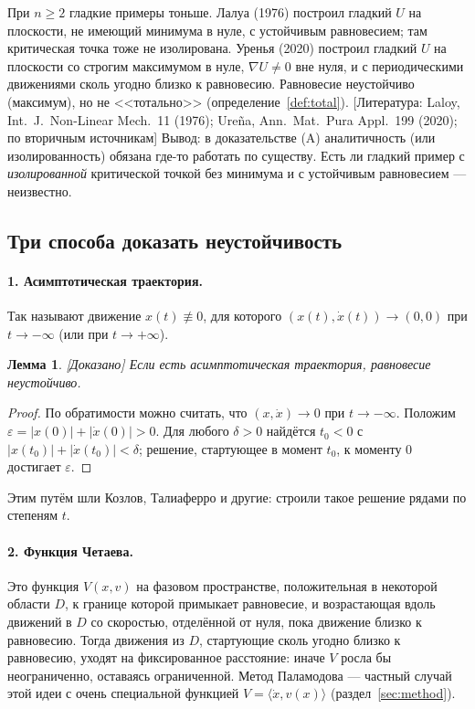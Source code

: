 \documentclass[11pt,a4paper]{article}
\newtheorem{lemma}[theorem]{Лемма}
\theoremstyle{definition}
\newcommand{\eps}{\varepsilon}
\newcommand{\mk}[1]{\textsf{[#1]}}
\begin{document}
При $n\ge2$ гладкие примеры тоньше. Лалуа (1976) построил гладкий $U$ на плоскости, не имеющий
минимума в нуле, с устойчивым равновесием; там критическая точка тоже не изолирована.
Уренья (2020) построил гладкий $U$ на плоскости со строгим максимумом в нуле, $\nabla U\ne0$ вне
нуля, и с периодическими движениями сколь угодно близко к равновесию. Равновесие неустойчиво
(максимум), но не <<тотально>> (определение~\ref{def:total}). \mk{Литература: Laloy, Int.\ J.\
Non-Linear Mech.\ 11 (1976); Ureña, Ann.\ Mat.\ Pura Appl.\ 199 (2020); по вторичным
источникам} Вывод: в доказательстве (A) аналитичность (или изолированность) обязана где-то
работать по существу. Есть ли гладкий пример с \emph{изолированной} критической точкой без
минимума и с устойчивым равновесием --- неизвестно.

\subsection{Три способа доказать неустойчивость}\label{subsec:three}

\paragraph{1. Асимптотическая траектория.} Так называют движение $x(t)\not\equiv0$, для
которого $(x(t),\dot x(t))\to(0,0)$ при $t\to-\infty$ (или при $t\to+\infty$).

\begin{lemma}\label{lem:asympt}
\mk{Доказано} Если есть асимптотическая траектория, равновесие неустойчиво.
\end{lemma}
\begin{proof}
По обратимости можно считать, что $(x,\dot x)\to0$ при $t\to-\infty$. Положим
$\eps=|x(0)|+|\dot x(0)|>0$. Для любого $\delta>0$ найдётся $t_0<0$ с
$|x(t_0)|+|\dot x(t_0)|<\delta$; решение, стартующее в момент $t_0$, к моменту $0$ достигает
$\eps$.
\end{proof}

Этим путём шли Козлов, Талиаферро и другие: строили такое решение рядами по степеням $t$.

\paragraph{2. Функция Четаева.} Это функция $V(x,v)$ на фазовом пространстве, положительная в
некоторой области $D$, к границе которой примыкает равновесие, и возрастающая вдоль движений
в $D$ со скоростью, отделённой от нуля, пока движение близко к равновесию. Тогда движения из $D$,
стартующие сколь угодно близко к равновесию, уходят на фиксированное расстояние: иначе $V$
росла бы неограниченно, оставаясь ограниченной. Метод Паламодова --- частный случай этой идеи
с очень специальной функцией $V=\langle\dot x,v(x)\rangle$ (раздел~\ref{sec:method}).
\end{document}
